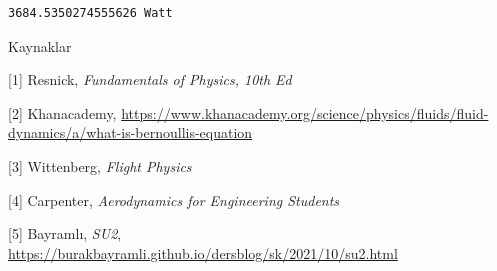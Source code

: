 \documentclass[12pt,fleqn]{article}\usepackage{../../common}
\begin{document}
\begin{verbatim}
3684.5350274555626 Watt
\end{verbatim}

Kaynaklar

[1] Resnick, {\em Fundamentals of Physics, 10th Ed}

[2] Khanacademy, 
    \url{https://www.khanacademy.org/science/physics/fluids/fluid-dynamics/a/what-is-bernoullis-equation}

[3] Wittenberg, {\em Flight Physics}

[4] Carpenter, {\em Aerodynamics for Engineering Students}

[5] Bayramlı, {\em SU2},
    \url{https://burakbayramli.github.io/dersblog/sk/2021/10/su2.html}


    
\end{document}
